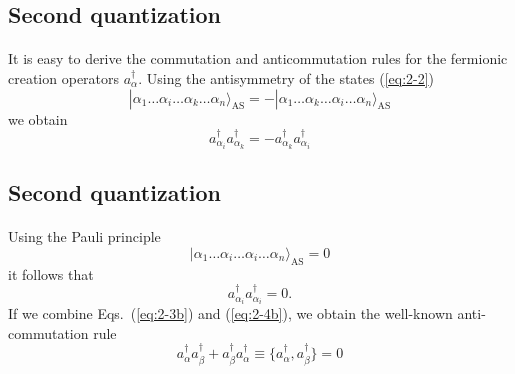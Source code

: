 \documentclass[%
twoside,                 %
final,                   %
10pt]{article}
\begin{document}
\subsection*{Second quantization}

\paragraph{}
It is easy to derive the commutation and anticommutation rules  for the fermionic creation operators 
$a_\alpha^{\dagger}$. Using the antisymmetry of the states 
(\ref{eq:2-2})
\begin{equation}
	|\alpha_1\dots \alpha_i\dots \alpha_k\dots \alpha_n\rangle_{\mathrm{AS}} = 
		- |\alpha_1\dots \alpha_k\dots \alpha_i\dots \alpha_n\rangle_{\mathrm{AS}} \label{eq:2-3a}
\end{equation}
we obtain
\begin{equation}
	 a_{\alpha_i}^{\dagger}  a_{\alpha_k}^{\dagger} = - a_{\alpha_k}^{\dagger} a_{\alpha_i}^{\dagger} \label{eq:2-3b}
\end{equation}



\subsection*{Second quantization}

\paragraph{}
Using the Pauli principle
\begin{equation}
	|\alpha_1\dots \alpha_i\dots \alpha_i\dots \alpha_n\rangle_{\mathrm{AS}} = 0 \label{eq:2-4a}
\end{equation}
it follows that
\begin{equation}
	a_{\alpha_i}^{\dagger}  a_{\alpha_i}^{\dagger} = 0. \label{eq:2-4b}
\end{equation}
If we combine Eqs.~(\ref{eq:2-3b}) and (\ref{eq:2-4b}), we obtain the well-known anti-commutation rule
\begin{equation}
	a_{\alpha}^{\dagger}  a_{\beta}^{\dagger} + a_{\beta}^{\dagger}  a_{\alpha}^{\dagger} \equiv 
		\{a_{\alpha}^{\dagger},a_{\beta}^{\dagger}\} = 0 \label{eq:2-5}
\end{equation}
\end{document}
